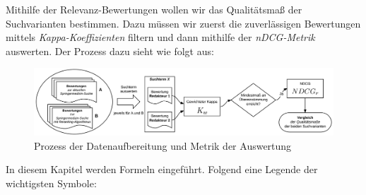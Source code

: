 Mithilfe der Relevanz-Bewertungen wollen wir das Qualitätsmaß der Suchvarianten bestimmen. Dazu müssen wir zuerst die \glqq zuverlässigen\grqq{} Bewertungen mittels \textit{Kappa-Koeffizienten} filtern und dann mithilfe der \textit{nDCG-Metrik} auswerten. Der Prozess dazu sieht wie folgt aus:

\begin{figure}[H]
\centering
\vspace{-.5em}
\caption[Prozess der Datenaufbereitung und Metrik der Auswertung]{Prozess der Datenaufbereitung und Metrik der Auswertung}
\vspace{.5em}
\label{fig:SucheSpringerNature}
\includegraphics[width=\linewidth]{gfx/EvaluationDatenaufbereitung}
\vspace{-2em}
\end{figure}

\pagebreak

In diesem Kapitel werden Formeln eingeführt. Folgend eine Legende der wichtigsten Symbole:

